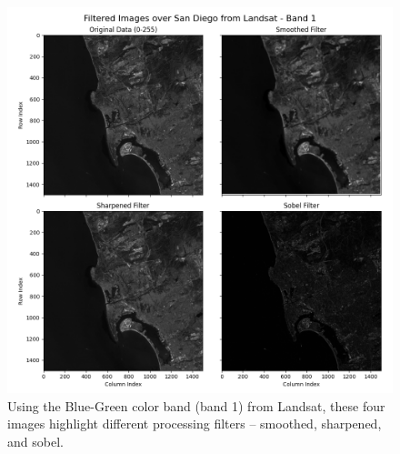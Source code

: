 \documentclass{homework}
\begin{document}
\begin{figure}
    \centering
    \includegraphics[width=\textwidth]{images/Filtered_Images.png}
    \caption{Using the Blue-Green color band (band 1) from Landsat, these four images highlight different processing filters -- smoothed, sharpened, and sobel.}
    \label{fig:Filtered_Images}
\end{figure}
\end{document}
